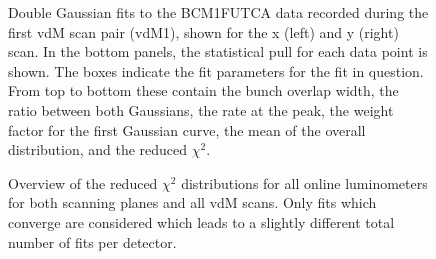\begin{figure}[!htb]
	\centering
	\caption[Double Gaussian fits for BCM1FUTCA]{Double Gaussian fits to the BCM1FUTCA data recorded during the first vdM scan pair (vdM1), shown for the x (left) and y (right) scan. In the bottom panels, the statistical pull for each data point is shown. The boxes indicate the fit parameters for the fit in question. From top to bottom these contain the bunch overlap width, the ratio between both Gaussians, the rate at the peak, the weight factor for the first Gaussian curve, the mean of the overall distribution, and the reduced $\chi^2$.}
	\label{fig:fit_BCM1FUTCA_103}
\end{figure}

\begin{figure}[!htb]
	\centering
	\caption[Scan fits reduced $\chi^2$ distribution]{Overview of the reduced $\chi^2$ distributions for all online luminometers for both scanning planes and all vdM scans. Only fits which converge are considered which leads to a slightly different total number of fits per detector.}
	\label{fig:chi2_distributions}
\end{figure}

